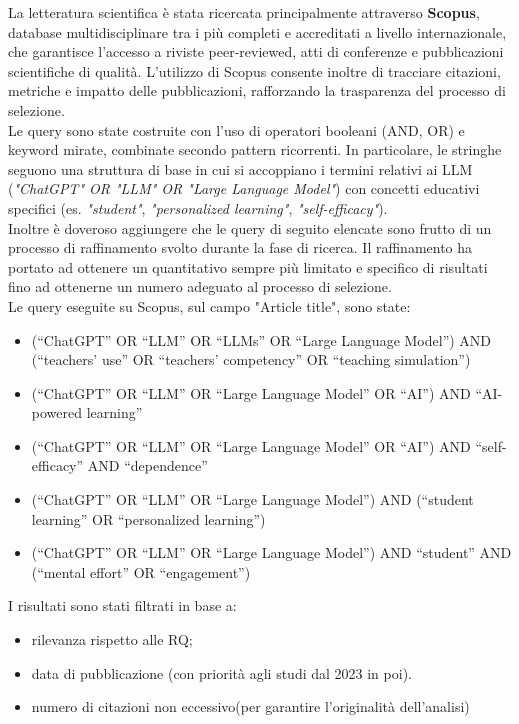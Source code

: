 \documentclass[a4paper,9pt]{article}
\begin{document}
	La letteratura scientifica è stata ricercata principalmente attraverso \textbf{Scopus}, database multidisciplinare tra i più completi e accreditati a livello internazionale, che garantisce l’accesso a riviste peer-reviewed, atti di conferenze e pubblicazioni scientifiche di qualità. L’utilizzo di Scopus consente inoltre di tracciare citazioni, metriche e impatto delle pubblicazioni, rafforzando la trasparenza del processo di selezione.\\
	Le query sono state costruite con l’uso di operatori booleani (AND, OR) e keyword mirate, combinate secondo pattern ricorrenti. In particolare, le stringhe seguono una struttura di base in cui si accoppiano i termini relativi ai LLM (\emph{"ChatGPT" OR "LLM" OR "Large Language Model"}) con concetti educativi specifici (es. \emph{"student"}, \emph{"personalized learning"}, \emph{"self-efficacy"}).\\ Inoltre è doveroso aggiungere che le query di seguito elencate sono frutto di un processo di raffinamento svolto durante la fase di ricerca. Il raffinamento ha portato ad ottenere un quantitativo sempre più limitato e specifico di risultati fino ad ottenerne un numero adeguato al processo di selezione.\\
	Le query eseguite su Scopus, sul campo "Article title", sono state:
	
	\begin{itemize}
		\item (``ChatGPT'' OR ``LLM'' OR ``LLMs'' OR ``Large Language Model'') AND (``teachers' use'' OR ``teachers' competency'' OR ``teaching simulation'')
		\item (``ChatGPT'' OR ``LLM'' OR ``Large Language Model'' OR ``AI'') AND ``AI-powered learning''
		\item (``ChatGPT'' OR ``LLM'' OR ``Large Language Model'' OR ``AI'') AND ``self-efficacy'' AND ``dependence''
		\item (``ChatGPT'' OR ``LLM'' OR ``Large Language Model'') AND (``student learning'' OR ``personalized learning'')
		\item (``ChatGPT'' OR ``LLM'' OR ``Large Language Model'') AND ``student'' AND (``mental effort'' OR ``engagement'')
	\end{itemize}
	
	I risultati sono stati filtrati in base a:
	\begin{itemize}
		\item rilevanza rispetto alle RQ;
		\item data di pubblicazione (con priorità agli studi dal 2023 in poi).
		\item numero di citazioni non eccessivo(per garantire l'originalità dell'analisi)
	\end{itemize}
	
\end{document}
